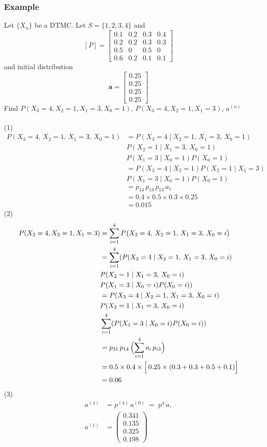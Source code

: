\documentclass[12pt]{article}
\begin{document}
\subsubsection*{Example}
Let $\{X_n\}$ be a DTMC. Let $S=\{1,2,3,4\}$ and 
\[
   [P] =  \begin{bmatrix}
0.1 & 0.2 & 0.3 & 0.4\\
0.2 & 0.2 & 0.3 & 0.3 \\
0.5 & 0 & 0.5 & 0\\
0.6 & 0.2 & 0.1 & 0.1
\end{bmatrix}
\]
and initial distribution 
\[
\textbf{a} = \begin{bmatrix}
0.25 \\
0.25 \\
0.25 \\
0.25 
\end{bmatrix}
\]
Find $P(X_3=4,X_2=1,X_1=3,X_0=1)$, $P(X_3=4,X_2=1,X_1=3)$, $a^{(n)}$\\\\
(1)
\begin{align*}
    P(X_{3}=4,\,X_{2}=1,\,X_{1}=3,\,X_{0}=1)
    &= P(X_{3}=4 \mid X_{2}=1,\,X_{1}=3,\,X_{0}=1)\\
     &  P(X_{2}=1 \mid X_{1}=3,\,X_{0}=1)\\
     &  P(X_{1}=3 \mid X_{0}=1)  P(X_{0}=1)\\
    &=P(X_{3}=4 \mid X_{2}=1)P(X_{2}=1 \mid X_{1}=3)\\
     &  P(X_{1}=3 \mid X_{0}=1)  P(X_{0}=1)\\
    &= p_{14}\,p_{13}\,p_{13}\,a_{1}\\
    &= 0.4 \times 0.5 \times 0.3 \times 0.25\\
    &= 0.015
\end{align*}
(2)
\begin{align*}
P(X_{3}=4,X_{2}=1, X_{1}=3)
&= \sum_{i=1}^{4} P\bigl(X_{3}=4,\,X_{2}=1,\,X_{1}=3,\,X_{0}=i\bigr)\\
&= \sum_{i=1}^{4} (P(X_{3}=4 \mid X_{2}=1,\,X_{1}=3,\,X_{0}=i)\\
     &  P(X_{2}=1 \mid X_{1}=3,\,X_{0}=i)\\
     &  P(X_{1}=3 \mid X_{0}=i)  P(X_{0}=i))\\
&= P(X_{3}=4 \mid X_{2}=1,\,X_{1}=3,\,X_{0}=i)\\
     &  P(X_{2}=1 \mid X_{1}=3,\,X_{0}=i)\\
     &   \sum_{i=1}^{4} (P(X_{1}=3 \mid X_{0}=i)  P(X_{0}=i))\\
&= p_{31}\,p_{14}\,\Bigl(\sum_{i=1}^{4} a_{i}\,p_{i3}\Bigr)\\
&= 0.5 \times 0.4 \times \Bigl[\,0.25 \times (0.3 + 0.3 + 0.5 + 0.1)\Bigr]\\
&= 0.06
\end{align*}
(3)
\begin{align*}
a^{(4)} &= p^{(4)}\,a^{(0)} \;=\; p^4\,a,\\
a^{(1)} 
&= \begin{pmatrix}
0.341\\
0.135\\
0.325\\
0.198
\end{pmatrix}
\end{align*}
\end{document}
